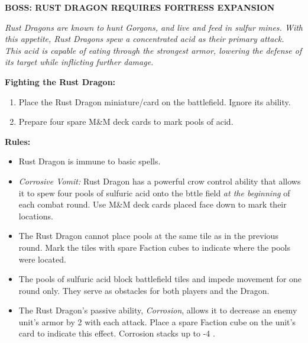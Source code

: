 \begin{minipage}{0.3\textwidth}
\end{minipage}
\begin{minipage}{0.7\textwidth}
  \textbf{\MakeUppercase{Boss: Rust Dragon {\scriptsize Requires Fortress Expansion}}}

  \medskip

  \textit{Rust Dragons are known to hunt Gorgons, and live and feed in sulfur mines.
    With this appetite, Rust Dragons spew a concentrated acid as their primary attack.
    This acid is capable of eating through the strongest armor, lowering the defense of its target while inflicting further damage.
  }

  \medskip

  \textbf{Fighting the Rust Dragon:}
  \begin{enumerate}
    \item Place the Rust Dragon miniature/card on the battlefield.
      Ignore its ability.
    \item Prepare four spare M\&M deck cards to mark pools of acid.
  \end{enumerate}

  \medskip

  \textbf{Rules:}
  \begin{itemize}
    \item Rust Dragon is immune to basic spells.
    \item \textit{Corrosive Vomit:} Rust Dragon has a powerful crow control ability that allows it to spew four pools of sulfuric acid onto the bttle field \textit{at the beginning} of each combat round.
      Use M\&M deck cards placed face down to mark their locations.
    \item The Rust Dragon cannot place pools at the same tile as in the previous round.
      Mark the tiles with spare Faction cubes to indicate where the pools were located.
    \item The pools of sulfuric acid block battlefield tiles and impede movement for one round only.
      They serve as obstacles for both players and the Dragon.
    \item The Rust Dragon's passive ability, \textit{Corrosion}, allows it to decrease an enemy unit's armor by 2 with each attack.
      Place a spare Faction cube on the unit's card to indicate this effect.
      Corrosion stacks up to -4 .
  \end{itemize}
\end{minipage}

